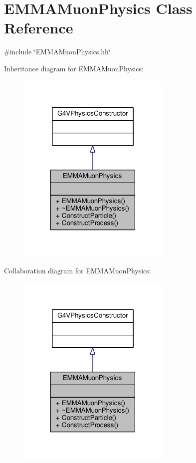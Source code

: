 \hypertarget{classEMMAMuonPhysics}{}\section{E\+M\+M\+A\+Muon\+Physics Class Reference}
\label{classEMMAMuonPhysics}


{\ttfamily \#include \char`\"{}E\+M\+M\+A\+Muon\+Physics.\+hh\char`\"{}}



Inheritance diagram for E\+M\+M\+A\+Muon\+Physics\+:
\nopagebreak
\begin{figure}[H]
\begin{center}
\leavevmode
\includegraphics[width=207pt]{classEMMAMuonPhysics__inherit__graph}
\end{center}
\end{figure}


Collaboration diagram for E\+M\+M\+A\+Muon\+Physics\+:
\nopagebreak
\begin{figure}[H]
\begin{center}
\leavevmode
\includegraphics[width=207pt]{classEMMAMuonPhysics__coll__graph}
\end{center}
\end{figure}

